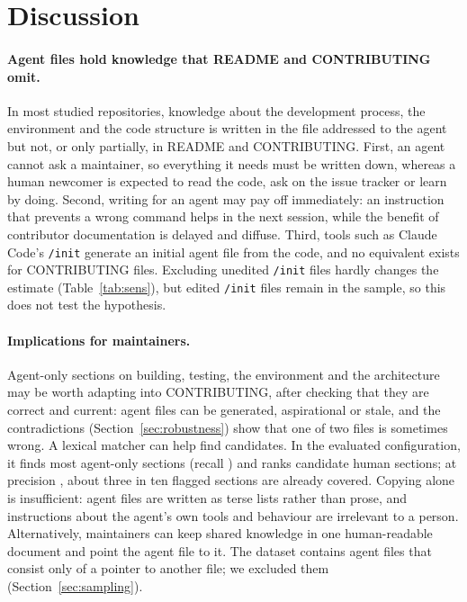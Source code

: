 \documentclass[sigconf,nonacm]{acmart}
\begin{document}
\section{Discussion}\label{sec:discussion}

\paragraph{Agent files hold knowledge that README and CONTRIBUTING omit.} In most studied
repositories, knowledge about the development process, the environment and the code structure is
written in the file addressed to the agent but not, or only partially, in README and CONTRIBUTING.
First, an agent cannot ask a maintainer, so everything it needs must be
written down, whereas a human newcomer is expected to read the code, ask on the issue tracker or
learn by doing. Second, writing for an agent may pay off immediately: an instruction that prevents a
wrong command helps in the next session, while the benefit of contributor documentation is delayed and
diffuse. Third, tools such as Claude Code's \texttt{/init} generate an initial agent file from the
code, and no equivalent exists for CONTRIBUTING files. Excluding unedited \texttt{/init} files
hardly changes the estimate (Table~\ref{tab:sens}), but edited \texttt{/init} files remain in the
sample, so this does not test the hypothesis.

\paragraph{Implications for maintainers.} Agent-only sections on building, testing, the environment
and the architecture may be worth adapting into CONTRIBUTING, after checking that they are correct
and current: agent files can be generated, aspirational or stale, and the \nConflictUnits{}
contradictions (Section~\ref{sec:robustness}) show that one of two files is sometimes wrong. A
lexical matcher can help find candidates. In the evaluated configuration, it finds most agent-only
sections (recall \detectorRecall) and ranks candidate human sections; at precision
\detectorPrecision, about three in ten flagged sections are already covered. Copying alone is
insufficient: agent files are written as terse lists rather than prose, and instructions about the
agent's own tools and behaviour are irrelevant to a person. Alternatively, maintainers can keep
shared knowledge in one human-readable document and point the agent file to it. The dataset contains
\nLinkOnlyFiles{} agent files that consist only of a pointer to another file; we excluded them
(Section~\ref{sec:sampling}).
\end{document}
